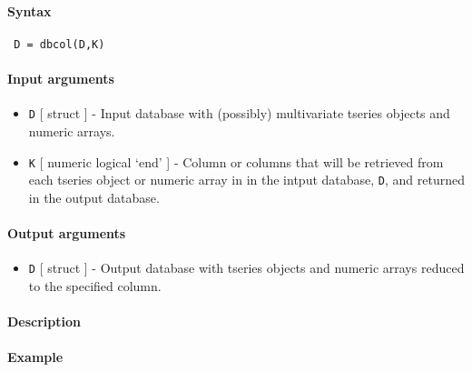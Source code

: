 


	\paragraph{Syntax}
 
 \begin{verbatim}
 D = dbcol(D,K)
 \end{verbatim}
 
 \paragraph{Input arguments}
 
 \begin{itemize}
 \item
   \texttt{D} {[} struct {]} - Input database with (possibly)
   multivariate tseries objects and numeric arrays.
 \item
   \texttt{K} {[} numeric \textbar{} logical \textbar{} `end' {]} -
   Column or columns that will be retrieved from each tseries object or
   numeric array in in the intput database, \texttt{D}, and returned in
   the output database.
 \end{itemize}
 
 \paragraph{Output arguments}
 
 \begin{itemize}
 \item
   \texttt{D} {[} struct {]} - Output database with tseries objects and
   numeric arrays reduced to the specified column.
 \end{itemize}
 
 \paragraph{Description}
 
 \paragraph{Example}


